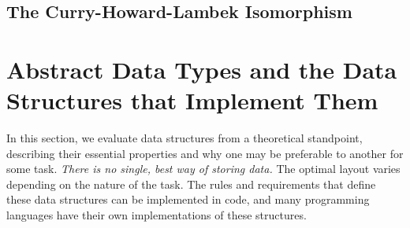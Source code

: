 
\subsection{The Curry-Howard-Lambek Isomorphism}







\toclineskip
\section{Abstract Data Types and the Data Structures that Implement Them}





In this section, we evaluate data structures from a theoretical standpoint, describing their essential properties and why one may be preferable to another for some task. \textit{There is no single, best way of storing data.} The optimal layout varies depending on the nature of the task. The rules and requirements that define these data structures can be implemented in code, and many programming languages have their own implementations of these structures. \\

